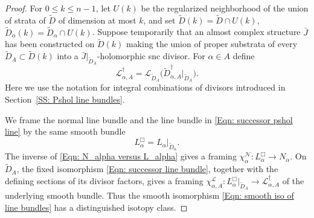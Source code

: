 \documentclass[11pt]{amsart}
\numberwithin{equation}{section}
\theoremstyle{plain}
\theoremstyle{definition}
\newcommand{\scrL}{\mathscr{L}}
\newcommand{\scrN}{\mathscr{N}}
\begin{document}
\begin{proof}
For $0\le k\le n-1$, let $U(k)$ be the regularized neighborhood of the union of
strata of $\widetilde D$ of dimension at most $k$, and set $\widetilde
D(k)=\widetilde D\cap U(k)$, $\widetilde D_\alpha(k)=\widetilde D_\alpha\cap
U(k)$. Suppose temporarily that an almost complex structure $\bar J$ has been
constructed on $\widetilde D(k)$ making the union of proper substrata of every
$\widetilde D_A\subset\widetilde D(k)$ into a $\bar J|_{\widetilde
D_A}$-holomorphic snc divisor. For $\alpha\in A$ define
\begin{equation}
\label{Eqn: successor pshol line}
\scrL^\dagger_{\alpha,A}
=
\scrL_{\widetilde D_A}
\bigl(\widetilde D^\dagger_{\alpha,A}|_{\widetilde D_A}\bigr).
\end{equation}
Here we use the notation for integral combinations of divisors introduced in
Section~\ref{SS: Pshol line bundles}.

We frame the normal line bundle and the line bundle in
\eqref{Eqn: successor pshol line} by the same smooth bundle
\[
L^\Box_\alpha=L_\alpha|_{\widetilde D_\alpha}.
\]
The inverse of \eqref{Eqn: N_alpha versus L_alpha} gives a framing
$\chi^\scrN_\alpha:L^\Box_\alpha\to N_\alpha$. On $\widetilde D_A$, the fixed
isomorphism \eqref{Eqn: successor line bundle}, together with the defining
sections of its divisor factors, gives a framing
$\chi^\scrL_{\alpha,A}:L^\Box_\alpha|_{\widetilde D_A}\to
\scrL^\dagger_{\alpha,A}$ of the underlying smooth bundle. Thus the smooth
isomorphism \eqref{Eqn: smooth iso of line bundles} has a distinguished isotopy
class.


\end{proof}
\end{document}
